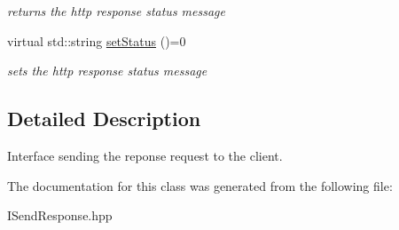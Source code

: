\begin{DoxyCompactItemize}
\begin{DoxyCompactList}\small\item\em returns the http response status message \end{DoxyCompactList}\item 
\hypertarget{class_i_send_response_add6ea9f2cd5a8b004ea08dd4954119e7}{}virtual std\+::string \hyperlink{class_i_send_response_add6ea9f2cd5a8b004ea08dd4954119e7}{set\+Status} ()=0\label{class_i_send_response_add6ea9f2cd5a8b004ea08dd4954119e7}

\begin{DoxyCompactList}\small\item\em sets the http response status message \end{DoxyCompactList}\end{DoxyCompactItemize}


\subsection{Detailed Description}
Interface sending the reponse request to the client. 

The documentation for this class was generated from the following file\+:\begin{DoxyCompactItemize}
\item 
I\+Send\+Response.\+hpp\end{DoxyCompactItemize}

